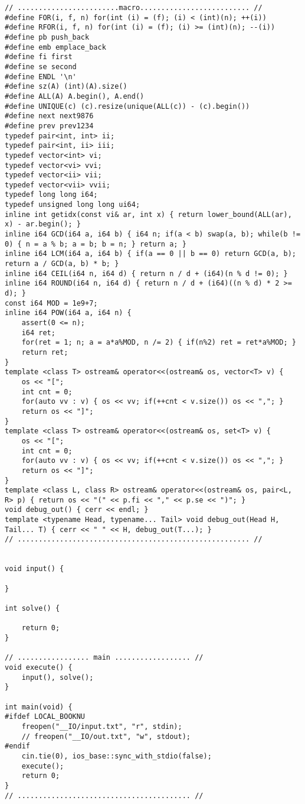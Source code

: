 \documentclass[landscape, 8pt, a4paper, oneside, twocolumn]{extarticle}
\begin{document}
\begin{verbatim}
// ........................macro.......................... //
#define FOR(i, f, n) for(int (i) = (f); (i) < (int)(n); ++(i))
#define RFOR(i, f, n) for(int (i) = (f); (i) >= (int)(n); --(i))
#define pb push_back
#define emb emplace_back
#define fi first
#define se second
#define ENDL '\n'
#define sz(A) (int)(A).size()
#define ALL(A) A.begin(), A.end()
#define UNIQUE(c) (c).resize(unique(ALL(c)) - (c).begin())
#define next next9876
#define prev prev1234
typedef pair<int, int> ii;
typedef pair<int, ii> iii;
typedef vector<int> vi;
typedef vector<vi> vvi;
typedef vector<ii> vii;
typedef vector<vii> vvii;
typedef long long i64;
typedef unsigned long long ui64;
inline int getidx(const vi& ar, int x) { return lower_bound(ALL(ar), x) - ar.begin(); }
inline i64 GCD(i64 a, i64 b) { i64 n; if(a < b) swap(a, b); while(b != 0) { n = a % b; a = b; b = n; } return a; }
inline i64 LCM(i64 a, i64 b) { if(a == 0 || b == 0) return GCD(a, b); return a / GCD(a, b) * b; }
inline i64 CEIL(i64 n, i64 d) { return n / d + (i64)(n % d != 0); }
inline i64 ROUND(i64 n, i64 d) { return n / d + (i64)((n % d) * 2 >= d); }
const i64 MOD = 1e9+7;
inline i64 POW(i64 a, i64 n) {
	assert(0 <= n);
	i64 ret;
	for(ret = 1; n; a = a*a%MOD, n /= 2) { if(n%2) ret = ret*a%MOD; }
	return ret;
}
template <class T> ostream& operator<<(ostream& os, vector<T> v) {
	os << "[";
	int cnt = 0;
	for(auto vv : v) { os << vv; if(++cnt < v.size()) os << ","; }
	return os << "]";
}
template <class T> ostream& operator<<(ostream& os, set<T> v) {
	os << "[";
	int cnt = 0;
	for(auto vv : v) { os << vv; if(++cnt < v.size()) os << ","; }
	return os << "]";
}
template <class L, class R> ostream& operator<<(ostream& os, pair<L, R> p) { return os << "(" << p.fi << "," << p.se << ")"; }
void debug_out() { cerr << endl; }
template <typename Head, typename... Tail> void debug_out(Head H, Tail... T) { cerr << " " << H, debug_out(T...); }
// ....................................................... //


void input() {
	
}

int solve() {
	
	return 0;
}

// ................. main .................. //
void execute() {
	input(), solve();
}

int main(void) {
#ifdef LOCAL_BOOKNU
	freopen("__IO/input.txt", "r", stdin);
	// freopen("__IO/out.txt", "w", stdout);
#endif
	cin.tie(0), ios_base::sync_with_stdio(false);
	execute();
	return 0;
}
// ......................................... //
\end{verbatim}
\end{document}
